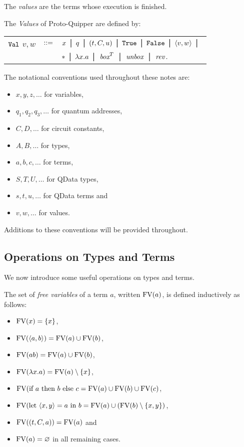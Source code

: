\documentclass[twoside]{article}
\begin{document}
The \emph{values} are the terms whose execution is finished.

\begin{definition}
The \emph{Values} of Proto-Quipper are defined by:
\begin{center}
\begin{tabular}{rcl}
$\texttt{Val}$ $v,w$ & $::=$ & $x \bor q \bor (t,C,u) \bor \true \bor 
  \false \bor \p{v,w} \bor$ \\
& & $* \bor \lambda x.a  \bor \boxx^T \bor \unbox \bor \rev.$
\end{tabular}
\end{center}
\end{definition}

The notational conventions used throughout these notes are:
\begin{itemize}
  \item $x,y,z,\ldots$ for variables,
  \item $q_1,q_2,q_3,\ldots$ for quantum addresses,
  \item $C,D,\ldots$ for circuit constants,
  \item $A,B,\ldots$ for types,
  \item $a,b,c,\ldots$ for terms,
  \item $S,T,U,\ldots$ for QData types,
  \item $s,t,u,\ldots$ for QData terms and
  \item $v,w,\ldots$ for values.
\end{itemize}
Additions to these conventions will be provided throughout.


\subsection{Operations on Types and Terms}

We now introduce some useful operations on types and terms. 

\begin{definition}
The set of \emph{free variables} of a term $a$, written $\mathop{\textrm{FV}}\nolimits(a)$, 
is defined inductively as follows:
\begin{itemize}
  \item $\mathop{\textrm{FV}}\nolimits(x)=\{x\}$,
  \item $\mathop{\textrm{FV}}\nolimits(\langle a,b\rangle)=\mathop{\textrm{FV}}\nolimits(a)\cup \mathop{\textrm{FV}}\nolimits(b)$,
  \item $\mathop{\textrm{FV}}\nolimits(ab)=\mathop{\textrm{FV}}\nolimits(a)\cup \mathop{\textrm{FV}}\nolimits(b)$,
  \item $\mathop{\textrm{FV}}\nolimits(\lambda x.a)=\mathop{\textrm{FV}}\nolimits(a)\setminus\{x\}$,
  \item $\mathop{\textrm{FV}}\nolimits(\text{if}~ a ~\text{then}~ b ~\text{else}~ c = \mathop{\textrm{FV}}\nolimits(a) \cup \mathop{\textrm{FV}}\nolimits(b) \cup \mathop{\textrm{FV}}\nolimits(c)$,
  \item $\mathop{\textrm{FV}}\nolimits(\text{let}~ \langle x,y\rangle = a ~\text{in}~ b= \mathop{\textrm{FV}}\nolimits(a)\cup (\mathop{\textrm{FV}}\nolimits(b)\setminus \{x,y\})$,
  \item $\mathop{\textrm{FV}}\nolimits((t,C,a))= \mathop{\textrm{FV}}\nolimits(a)$ and
  \item $\mathop{\textrm{FV}}\nolimits(a)=\varnothing$ in all remaining cases.
\end{itemize}
\end{definition}
\end{document}
